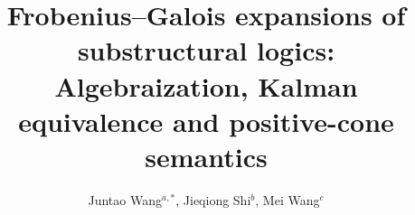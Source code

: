 \documentclass[final,12pt,times]{elsarticle}
\theoremstyle{plain}
\theoremstyle{definition}
\theoremstyle{break}
\begin{document}
\begin{frontmatter}


\title{\textbf{Frobenius–Galois expansions of substructural logics:
Algebraization, Kalman equivalence and positive-cone
semantics}}

\author{Juntao Wang$^{a,*}$, Jieqiong Shi$^{b}$, Mei Wang$^{c}$}

\address[A] {School of Science, Xi'an Petroleum University, Xi'an 710065, Shaanxi, P.R. China}
\address[B]{School of Mathematics and Data Science, Shaanxi University of Science and Technology, Xi’an 710021, China}
\address[C]{School of Science, Xi Hang University, Xi'an 710077, Shaanxi, P.R. China}



\end{frontmatter}
\end{document}
